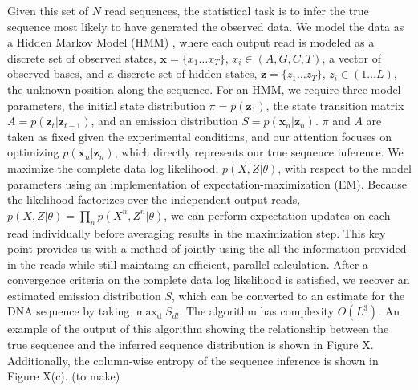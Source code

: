 \documentclass{biophys_letter}
\begin{document}
Given this set of $N$ read sequences, the statistical task is to infer the true sequence most likely to have generated the observed data.
We model the data as a Hidden Markov Model (HMM) \cite{Rabiner:1989}, where each output read is modeled as a discrete set of observed states, $\mathbf{x}=\{x_{1}\dots x_{T}\}$, $x_i \in (A,G,C,T)$, a vector of observed bases, and a discrete set of hidden states, $\mathbf{z}=\{z_{1} \dots z_{T}\}$, $z_i \in (1 \dots L)$, the unknown position along the sequence.
For an HMM, we require three model parameters, the initial state distribution $\pi=p(\mathbf{z}_{1})$, the state transition matrix $A=p(\mathbf{z}_{t}|\mathbf{z}_{t-1})$, and an emission distribution $S=p(\mathbf{x}_{n}|\mathbf{z}_{n})$. 
$\pi$ and $A$ are taken as fixed given the experimental conditions, and our attention focuses on optimizing $p(\mathbf{x}_{n}|\mathbf{z}_{n})$, which directly represents our true sequence inference.
We maximize the complete data log likelihood, $p(X,Z|\theta)$, with respect to the model parameters using an implementation of expectation-maximization (EM).
Because the likelihood factorizes over the independent output reads, $p(X,Z|\theta)=\prod_{n}p(X^n,Z^n|\theta)$, we can perform expectation updates on each read individually before averaging results in the maximization step.
This key point provides us with a method of jointly using the all the information provided in the reads while still maintaing an efficient, parallel calculation.
After a convergence criteria on the complete data log likelihood is satisfied, we recover an estimated emission distribution $S$, which can be converted to an estimate for the DNA sequence by taking $\mathrm{\max_{d}} {S_{dl}}$.
The algorithm has complexity $O(L^{3})$.
An example of the output of this algorithm showing the relationship between the true sequence and the inferred sequence distribution is shown in Figure X.
Additionally, the column-wise entropy of the sequence inference is shown in Figure X(c). (to make)
\end{document}
